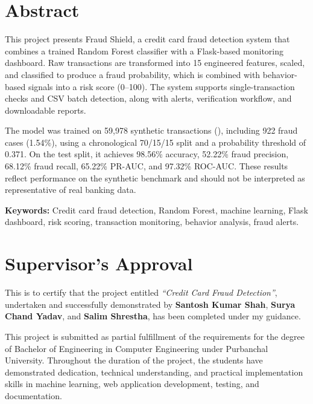 \documentclass[12pt,a4paper]{report}
\newcommand{\projecttitle}{Credit Card Fraud Detection}
\begin{document}
\newpage

\chapter*{Abstract}

This project presents Fraud Shield, a credit card fraud detection system that combines a trained Random Forest classifier with a Flask-based monitoring dashboard. Raw transactions are transformed into 15 engineered features, scaled, and classified to produce a fraud probability, which is combined with behavior-based signals into a risk score (0--100). The system supports single-transaction checks and CSV batch detection, along with alerts, verification workflow, and downloadable reports.

The model was trained on 59,978 synthetic transactions (), including 922 fraud cases (1.54\%), using a chronological 70/15/15 split and a probability threshold of 0.371. On the test split, it achieves 98.56\% accuracy, 52.22\% fraud precision, 68.12\% fraud recall, 65.22\% PR-AUC, and 97.32\% ROC-AUC. These results reflect performance on the synthetic benchmark and should not be interpreted as representative of real banking data.



\vspace{0.5cm}
\noindent\textbf{Keywords:} Credit card fraud detection, Random Forest, machine learning, Flask dashboard, risk scoring, transaction monitoring, behavior analysis, fraud alerts.

\newpage

\chapter*{Supervisor's Approval}

This is to certify that the project entitled \textit{``\projecttitle''}, undertaken and successfully demonstrated by \textbf{Santosh Kumar Shah}, \textbf{Surya Chand Yadav}, and \textbf{Salim Shrestha}, has been completed under my guidance.

This project is submitted as partial fulfillment of the requirements for the degree of Bachelor of Engineering in Computer Engineering under Purbanchal University. Throughout the duration of the project, the students have demonstrated dedication, technical understanding, and practical implementation skills in machine learning, web application development, testing, and documentation.
\end{document}
